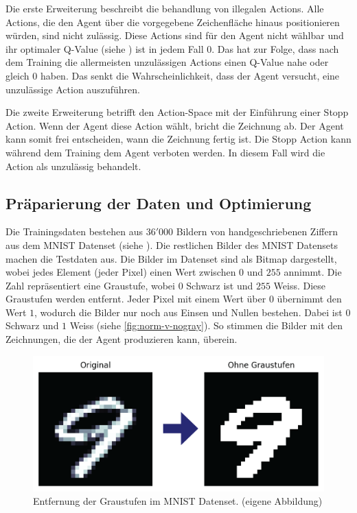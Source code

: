 Die erste Erweiterung beschreibt die behandlung von illegalen Actions. Alle
Actions, die den Agent über die vorgegebene Zeichenfläche hinaus positionieren
würden, sind nicht zulässig. Diese Actions sind für den Agent nicht wählbar
und ihr optimaler Q-Value (siehe ) ist in jedem Fall
$0$. Das hat zur Folge, dass nach dem Training die allermeisten unzulässigen
Actions einen Q-Value nahe oder gleich $0$ haben. Das senkt die
Wahrscheinlichkeit, dass der Agent versucht, eine unzulässige Action
auszuführen.

Die zweite Erweiterung betrifft den Action-Space mit der Einführung einer Stopp
Action. Wenn der Agent diese Action wählt, bricht die Zeichnung ab. Der Agent
kann somit frei entscheiden, wann die Zeichnung fertig ist. Die Stopp Action
kann während dem Training dem Agent verboten werden. In diesem Fall wird die
Action als unzulässig behandelt.

 
\subsection{Präparierung der Daten und Optimierung}\label{sub:m_grund_data}
Die Trainingsdaten bestehen aus $36'000$ Bildern von handgeschriebenen Ziffern
aus dem MNIST Datenset (siehe ). Die restlichen Bilder des
MNIST Datensets machen die Testdaten aus. Die Bilder im Datenset sind als Bitmap
dargestellt, wobei jedes Element (jeder Pixel) einen Wert zwischen $0$ und $255$
annimmt. Die Zahl repräsentiert eine Graustufe, wobei $0$ Schwarz ist und $255$
Weiss. Diese Graustufen werden entfernt. Jeder Pixel mit einem Wert über $0$
übernimmt den Wert $1$, wodurch die Bilder nur noch aus Einsen und Nullen
bestehen. Dabei ist $0$ Schwarz und $1$ Weiss (siehe \autoref{fig:norm-v-nogray}).
So stimmen die Bilder mit den Zeichnungen, die der Agent produzieren kann,
überein.
 
\begin{figure}[!ht]
 \centering
 \includegraphics[width=\textwidth]{images/methode/norm-v-nogray.png}
 \caption{Entfernung der Graustufen im MNIST Datenset. (eigene Abbildung)}\label{fig:norm-v-nogray}
\end{figure}
 
